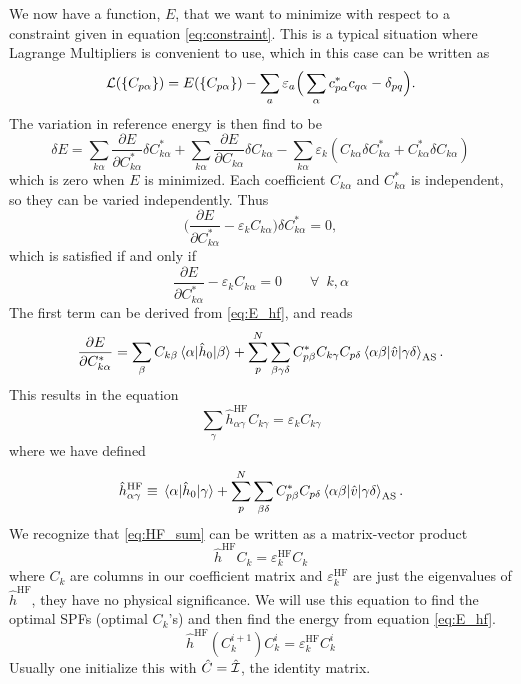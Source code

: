 We now have a function, $E$, that we want to minimize with respect to a constraint given in equation \eqref{eq:constraint}. This is a typical situation where Lagrange Multipliers is convenient to use, which in this case can be written as
\begin{equation}
{\cal L}(\{C_{p\alpha}\})=E(\{C_{p\alpha}\})-\sum_a\varepsilon_a\Big(\sum_{\alpha}c_{p\alpha}^*c_{q\alpha}-\delta_{pq}\Big).
\end{equation}
The variation in reference energy is then find to be
\begin{equation}
\delta E=\sum_{k\alpha}\frac{\partial E}{\partial C_{k\alpha}^*}\delta C_{k\alpha}^*+\sum_{k\alpha}\frac{\partial E}{\partial C_{k\alpha}}\delta C_{k\alpha}-\sum_{k\alpha}\varepsilon_k(C_{k\alpha}\delta C_{k\alpha}^*+C_{k\alpha}^*\delta C_{k\alpha})
\label{eq:E_hf}
\end{equation}
which is zero when $E$ is minimized. Each coefficient $C_{k\alpha}$ and $C_{k\alpha}^*$ is independent, so they can be varied independently. Thus
\begin{equation}
\bigg(\frac{\partial E}{\partial C_{k\alpha}^*}-\varepsilon_kC_{k\alpha}\bigg)\delta C_{k\alpha}^*=0,
\end{equation}
which is satisfied if and only if
\begin{equation}
\frac{\partial E}{\partial C_{k\alpha}^*}-\varepsilon_kC_{k\alpha}=0\qquad\forall\,\,\, k,\alpha
\end{equation}
The first term can be derived from \eqref{eq:E_hf}, and reads
\begin{equation}
\frac{\partial E}{\partial C_{k\alpha}^*}=\sum_{\beta}C_{k\beta}\mel{\alpha}{\hat{h}_0}{\beta}+\sum_p^N\sum_{\beta\gamma\delta}C_{p\beta}^*C_{k\gamma}C_{p\delta}\mel{\alpha\beta}{\hat{v}}{\gamma\delta}_{\text{AS}}.
\end{equation}
This results in the equation
\begin{equation}
\sum_{\gamma}\hat{h}_{\alpha\gamma}^{\text{HF}}C_{k\gamma}=\varepsilon_kC_{k\gamma}
\label{eq:HF_sum}
\end{equation}
where we have defined
\begin{equation}
\hat{h}_{\alpha\gamma}^{\text{HF}}\equiv\mel{\alpha}{\hat{h}_0}{\gamma}+\sum_p^N\sum_{\beta\delta}C_{p\beta}^*C_{p\delta}\mel{\alpha\beta}{\hat{v}}{\gamma\delta}_{\text{AS}}.
\end{equation}
We recognize that \eqref{eq:HF_sum} can be written as a matrix-vector product
\begin{equation}
\hat{h}^{\text{HF}}C_k=\varepsilon_k^{\text{HF}}C_k
\end{equation}
where $C_k$ are columns in our coefficient matrix and $\varepsilon_k^{\text{HF}}$ are just the eigenvalues of $\hat{h}^{\text{HF}}$, they have no physical significance. We will use this equation to find the optimal SPFs (optimal $C_k$'s) and then find the energy from equation \eqref{eq:E_hf}.
\begin{equation}
\hat{h}^{\text{HF}}(C_k^{i+1})C_k^i=\varepsilon_k^{\text{HF}}C_k^i
\label{eq:HF_iter}
\end{equation}
Usually one initialize this with $\hat{C}=\hat{{\cal I}}$, the identity matrix.

